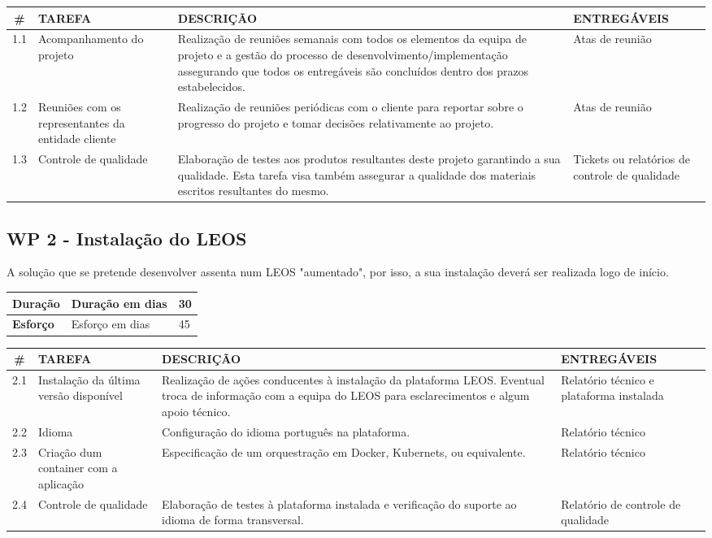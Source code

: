 \begin{longtable}{|c|p{5cm}|p{7cm}|p{3cm}|}
\hline
\# & \textbf{TAREFA} & \textbf{DESCRIÇÃO} & \textbf{ENTREGÁVEIS} \\
\hline
1.1 & Acompanhamento do projeto & Realização de reuniões semanais com todos os elementos da equipa de projeto e a gestão 
do processo de desenvolvimento/implementação assegurando que todos os entregáveis são concluídos dentro dos prazos 
estabelecidos. & Atas de reunião \\
\hline
1.2 & Reuniões com os representantes da entidade cliente & Realização de reuniões periódicas com o cliente para reportar sobre o 
progresso do projeto 
e tomar decisões relativamente ao projeto. & Atas de reunião \\
\hline
1.3 & Controle de qualidade & Elaboração de testes aos produtos resultantes deste projeto garantindo a sua qualidade. 
Esta tarefa visa também assegurar a qualidade dos materiais escritos resultantes do mesmo. 
& Tickets ou relatórios de controle de qualidade \\
\hline
\end{longtable}


\subsection{WP 2 - Instalação do LEOS}

A solução que se pretende desenvolver assenta num LEOS "aumentado", por isso, a sua instalação deverá ser realizada logo
de início.

\begin{tabular}{|p{3cm}|p{5cm}|l|}
    \hline
    \textbf{Duração} & Duração em dias & 30 \\
    \hline
    \textbf{Esforço} & Esforço em dias & 45\\
    \hline
\end{tabular}
    
\vspace{0.5cm}

\begin{longtable}{|c|p{5cm}|p{7cm}|p{3cm}|}
    \hline
    \# & \textbf{TAREFA} & \textbf{DESCRIÇÃO} & \textbf{ENTREGÁVEIS} \\
    \hline
    2.1 & Instalação da última versão disponível & Realização de ações conducentes à instalação da plataforma LEOS. Eventual troca 
    de informação com a equipa do LEOS para esclarecimentos e algum apoio técnico. & Relatório técnico e plataforma instalada \\
    \hline
    2.2 & Idioma & Configuração do idioma português na plataforma. & Relatório técnico \\
    \hline
    2.3 & Criação dum container com a aplicação & Especificação de um orquestração em Docker, Kubernets, ou equivalente. & Relatório técnico \\
    \hline
    2.4 & Controle de qualidade & Elaboração de testes à plataforma instalada e verificação do suporte ao idioma de forma transversal. 
    & Relatório de controle de qualidade \\
    \hline
\end{longtable}



